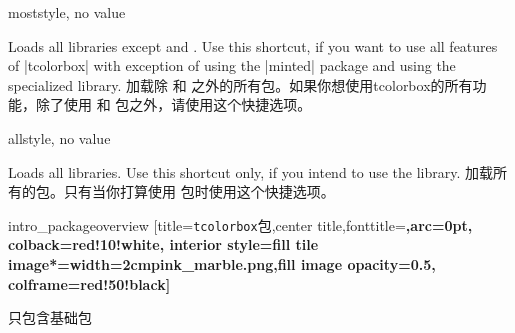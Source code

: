 \begin{docTcbKey}[library]{most}{}{style, no value}
\begin{stripedbox}
Loads all libraries except  and .
Use this shortcut, if you want to use all features of |tcolorbox|
with exception of using the |minted| package and using
the specialized  library.
\tcblower
加载除  和  之外的所有包。如果你想使用tcolorbox的所有功能，除了使用  和  包之外，请使用这个快捷选项。
\end{stripedbox}
\end{docTcbKey}

\begin{docTcbKey}[library]{all}{}{style, no value}
\begin{stripedbox}
Loads all libraries. Use this shortcut only, if you intend to use the
 library.
\tcblower
加载所有的包。只有当你打算使用  包时使用这个快捷选项。
\end{stripedbox}
\end{docTcbKey}

\begin{extcolorbox}[runs=2]%
{intro_packageoverview}
[title={\texttt{tcolorbox}包},center title,fonttitle=\bfseries,arc=0pt,
colback=red!10!white,
interior style={fill tile image*={width=2cm}{pink_marble.png},fill image opacity=0.5},
colframe=red!50!black]
\begin{tcolorbox}[beamer,adjusted title=基本特性,colframe=blue!50!black,colback=blue!10!white]
只包含基础包
\end{tcolorbox}
\begin{tcbitemize}[raster columns=3,raster before skip=2mm,raster after skip=0pt,
  raster equal height,beamer,colframe=blue!50!black,colback=blue!10!white]
\tcbitem[adjusted title=进阶特性]
  \\
  \\
  \\
  \\
  \\
  \\
  \\ 
  \\
  \\
  \\
\tcbitem[adjusted title=进阶的代码列表]
  \\
  \tcblower
\tcbitem[adjusted title=编写文档用]
\end{tcbitemize}
\end{extcolorbox}
